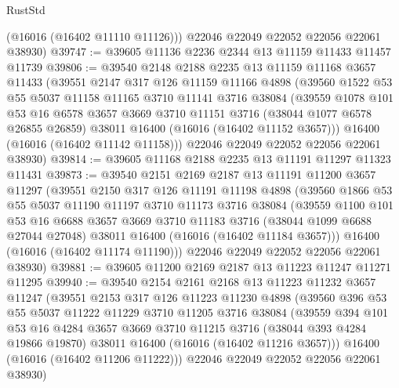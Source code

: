 \begin{lexlean}{RustStd}
\begin{coremodule}
        (@16016 (@16402 @11110 @11126)))
      @22046
      @22049
      @22052
      @22056
      @22061
      @38930)
@39747 := @39605 @11136 @2236 @2344 @13 @11159 @11433 @11457 @11739
@39806 := @39540
    @2148
    @2188
    @2235
    @13
    @11159
    @11168
    @3657
    @11433
    (@39551
      @2147
      @317
      @126
      @11159
      @11166
      @4898
      (@39560
        @1522
        @53
        @55
        @5037
        @11158
        @11165
        @3710
        @11141
        @3716
        @38084
        (@39559
          @1078
          @101
          @53
          @16
          @6578
          @3657
          @3669
          @3710
          @11151
          @3716
          (@38044 @1077 @6578 @26855 @26859)
          @38011
          @16400
          (@16016 (@16402 @11152 @3657)))
        @16400
        (@16016 (@16402 @11142 @11158)))
      @22046
      @22049
      @22052
      @22056
      @22061
      @38930)
@39814 := @39605 @11168 @2188 @2235 @13 @11191 @11297 @11323 @11431
@39873 := @39540
    @2151
    @2169
    @2187
    @13
    @11191
    @11200
    @3657
    @11297
    (@39551
      @2150
      @317
      @126
      @11191
      @11198
      @4898
      (@39560
        @1866
        @53
        @55
        @5037
        @11190
        @11197
        @3710
        @11173
        @3716
        @38084
        (@39559
          @1100
          @101
          @53
          @16
          @6688
          @3657
          @3669
          @3710
          @11183
          @3716
          (@38044 @1099 @6688 @27044 @27048)
          @38011
          @16400
          (@16016 (@16402 @11184 @3657)))
        @16400
        (@16016 (@16402 @11174 @11190)))
      @22046
      @22049
      @22052
      @22056
      @22061
      @38930)
@39881 := @39605 @11200 @2169 @2187 @13 @11223 @11247 @11271 @11295
@39940 := @39540
    @2154
    @2161
    @2168
    @13
    @11223
    @11232
    @3657
    @11247
    (@39551
      @2153
      @317
      @126
      @11223
      @11230
      @4898
      (@39560
        @396
        @53
        @55
        @5037
        @11222
        @11229
        @3710
        @11205
        @3716
        @38084
        (@39559
          @394
          @101
          @53
          @16
          @4284
          @3657
          @3669
          @3710
          @11215
          @3716
          (@38044 @393 @4284 @19866 @19870)
          @38011
          @16400
          (@16016 (@16402 @11216 @3657)))
        @16400
        (@16016 (@16402 @11206 @11222)))
      @22046
      @22049
      @22052
      @22056
      @22061
      @38930)

\end{coremodule}
\end{lexlean}
